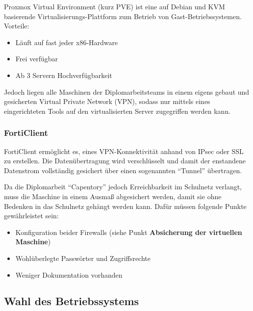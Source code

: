 \documentclass[
]{article}
\providecommand{\tightlist}{%
  \setlength{\itemsep}{0pt}\setlength{\parskip}{0pt}}
\begin{document}
Proxmox Virtual Environment (kurz PVE) ist eine auf Debian und KVM
basierende Virtualisierungs-Plattform zum Betrieb von
Gast-Betriebssystemen. Vorteile: 
\begin{itemize}
\tightlist
\item
  Läuft auf fast jeder x86-Hardware
\item
  Frei verfügbar
\item
  Ab 3 Servern Hochverfügbarkeit
\end{itemize}

Jedoch liegen alle Maschinen der Diplomarbeitsteams in einem eigens
gebaut und gesicherten Virtual Private Network (VPN), sodass nur mittels
eines eingerichteten Tools auf den virtualisierten Server zugegriffen
werden kann.

\hypertarget{forticlient}{%
\subsubsection{FortiClient}\label{forticlient}}

FortiClient ermöglicht es, eines VPN-Konnektivität anhand von IPsec oder
SSL zu erstellen. Die Datenübertragung wird verschlüsselt und damit der
enstandene Datenstrom vollständig gesichert über einen sogenannten
``Tunnel'' übertragen.

Da die Diplomarbeit ``Capentory'' jedoch Erreichbarkeit im Schulnetz
verlangt, muss die Maschine in einem Ausmaß abgesichert werden, damit
sie ohne Bedenken in das Schulnetz gehängt werden kann. Dafür müssen
folgende Punkte gewährleistet sein: 
\begin{itemize}
\tightlist
\item
  Konfiguration beider Firewalls (siehe Punkt \textbf{Absicherung der virtuellen Maschine})
\item
  Wohlüberlegte Passwörter und Zugriffsrechte
\item
  Weniger Dokumentation vorhanden
\end{itemize}

\hypertarget{wahl-des-betriebssystems}{%
\subsection{Wahl des Betriebssystems}\label{wahl-des-betriebssystems}}
\end{document}
